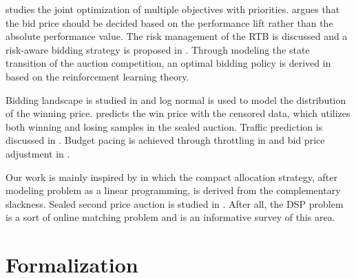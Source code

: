\documentclass{article}
\begin{document}
\cite{Joint2016} studies the joint optimization of multiple objectives with priorities.
\cite{Lift2016} argues that the bid price should be decided
    based on the performance lift rather than the absolute performance value.
The risk management of the RTB is discussed and a risk-aware bidding strategy is proposed in \cite{Risk2017}.
Through modeling the state transition of the auction competition,
    an optimal bidding policy is derived in \cite{Reinforce2017} based on the reinforcement learning theory.


Bidding landscape is studied in \cite{YingCui2011} and log normal is used to model the distribution of the winning price.
\cite{Wu2015} predicts the win price with the censored data, which utilizes both winning and losing samples in the sealed auction.
Traffic prediction is discussed in \cite{Traffic2016}.
Budget pacing is achieved through throttling in \cite{Throttle2015} and bid price adjustment in \cite{Pacing2013}.

Our work is mainly inspired by \cite{YeChen2011} in which the compact allocation strategy,
    after modeling problem as a linear programming, is derived from the complementary slackness.
Sealed second price auction is studied in \cite{SSPA1961}.
After all, the DSP problem is a sort of online matching problem and \cite{Mehta} is an informative survey of this area.

\section{Formalization} \label{Formalization}
\end{document}
